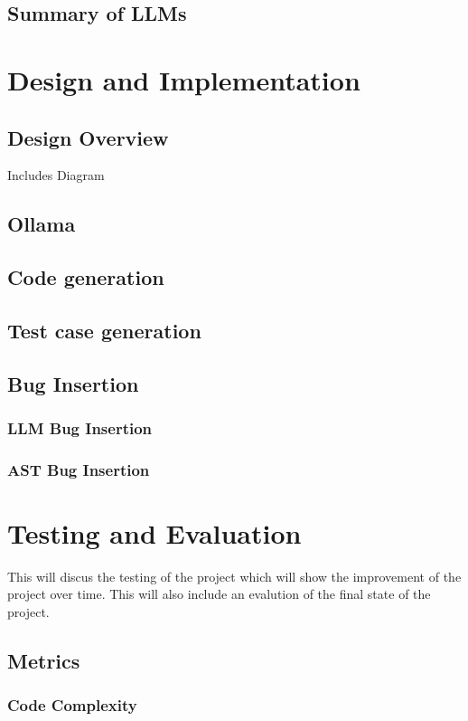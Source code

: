 \documentclass[12pt]{extarticle}
\begin{document}
\subsection{Summary of LLMs}


\section{Design and Implementation}

\subsection{Design Overview}
Includes Diagram
\subsection{Ollama}
\subsection{Code generation}
\subsection{Test case generation}
\subsection{Bug Insertion}
\subsubsection{LLM Bug Insertion}
\subsubsection{AST Bug Insertion}

\section{Testing and Evaluation}

This will discus the testing of the project which will show the improvement of the project over time. This will also include an evalution of the final state of the project.

\subsection{Metrics}
\subsubsection{Code Complexity}
\end{document}
